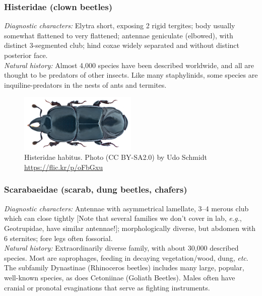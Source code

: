 \documentclass[letterpaper, 11pt]{article}
\begin{document}
\subsubsection{Histeridae (clown beetles)}
\noindent{}\textit{Diagnostic characters:} Elytra short, exposing 2 rigid tergites; body usually somewhat flattened to very flattened; antennae geniculate (elbowed), with distinct 3-segmented club; hind coxae widely separated and without distinct posterior face.\\

\noindent{}\textit{Natural history:} Almost 4,000 species have been described worldwide, and all are thought to be predators of other insects. Like many staphylinids, some species are inquiline-predators in the nests of ants and termites.

\begin{figure}[ht!]
  \centering
    \includegraphics[width=0.5\textwidth]{HisteridHabitus}
  \caption{Histeridae habitus. Photo (CC BY-SA2.0) by Udo Schmidt \url{https://flic.kr/p/oFbGxu}}
  \label{fig:histerid}
\end{figure}

\subsubsection{Scarabaeidae (scarab, dung beetles, chafers)}
\noindent{}\textit{Diagnostic characters:} Antennae with asymmetrical lamellate, 3--4 merous club which can close tightly [Note that several families we don't cover in lab, \textit{e.g.}, Geotrupidae, have similar antennae!]; morphologically diverse, but abdomen with 6 sternites; fore legs often fossorial.\\

\noindent{}\textit{Natural history:} Extraordinarily diverse family, with about 30,000 described species. Most are saprophages, feeding in decaying vegetation/wood, dung, \textit{etc}. The subfamily Dynastinae (Rhinoceros beetles) includes many large, popular, well-known species, as does Cetoniinae (Goliath Beetles). Males often have cranial or pronotal evaginations that serve as fighting instruments.
\end{document}
